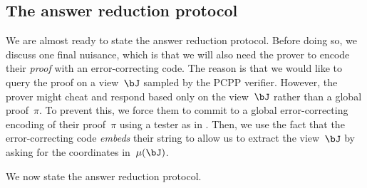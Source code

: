 \subsection{The answer reduction protocol}

We are almost ready to state the answer reduction protocol.
Before doing so, we discuss one final nuisance, which is that we will also need the prover to encode their \emph{proof} with an error-correcting code. 
The reason is that we would like to query the proof on a view~$\bJ$ sampled by the PCPP verifier.
However, the prover might cheat and respond based only on the view~$\bJ$ rather than a global proof~$\pi$.
To prevent this, we force them to commit to a global error-correcting encoding of their proof~$\pi$ using a tester as in .
Then, we use the fact that the error-correcting code \emph{embeds} their string to allow us to extract the view~$\bJ$ by asking for the coordinates in~$\mu(\bJ)$.

We now state the answer reduction protocol.

